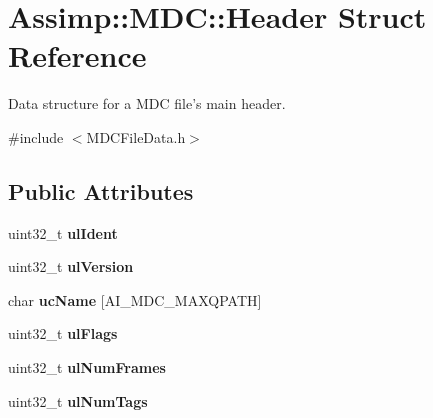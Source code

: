 \hypertarget{struct_assimp_1_1_m_d_c_1_1_header}{\section{Assimp\+:\+:M\+D\+C\+:\+:Header Struct Reference}
\label{struct_assimp_1_1_m_d_c_1_1_header}
}


Data structure for a M\+D\+C file's main header.  




{\ttfamily \#include $<$M\+D\+C\+File\+Data.\+h$>$}

\subsection*{Public Attributes}
\begin{DoxyCompactItemize}
\item 
\hypertarget{struct_assimp_1_1_m_d_c_1_1_header_adcd76905de71f9c87a34221511b21648}{uint32\+\_\+t {\bfseries ul\+Ident}}\label{struct_assimp_1_1_m_d_c_1_1_header_adcd76905de71f9c87a34221511b21648}

\item 
\hypertarget{struct_assimp_1_1_m_d_c_1_1_header_ae491dead8561b29f7d5e8c2b4e0e5202}{uint32\+\_\+t {\bfseries ul\+Version}}\label{struct_assimp_1_1_m_d_c_1_1_header_ae491dead8561b29f7d5e8c2b4e0e5202}

\item 
\hypertarget{struct_assimp_1_1_m_d_c_1_1_header_a1f0de2ba98f67cbdd0b9e15c8ea1a5c5}{char {\bfseries uc\+Name} \mbox{[}A\+I\+\_\+\+M\+D\+C\+\_\+\+M\+A\+X\+Q\+P\+A\+T\+H\mbox{]}}\label{struct_assimp_1_1_m_d_c_1_1_header_a1f0de2ba98f67cbdd0b9e15c8ea1a5c5}

\item 
\hypertarget{struct_assimp_1_1_m_d_c_1_1_header_a0973db3f06600cc05d9b3a641e76640d}{uint32\+\_\+t {\bfseries ul\+Flags}}\label{struct_assimp_1_1_m_d_c_1_1_header_a0973db3f06600cc05d9b3a641e76640d}

\item 
\hypertarget{struct_assimp_1_1_m_d_c_1_1_header_a36b7ce3cc444cbe08065d8fc7aa84103}{uint32\+\_\+t {\bfseries ul\+Num\+Frames}}\label{struct_assimp_1_1_m_d_c_1_1_header_a36b7ce3cc444cbe08065d8fc7aa84103}

\item 
\hypertarget{struct_assimp_1_1_m_d_c_1_1_header_a55e65e17c73cb04fa031ea07ac830233}{uint32\+\_\+t {\bfseries ul\+Num\+Tags}}\label{struct_assimp_1_1_m_d_c_1_1_header_a55e65e17c73cb04fa031ea07ac830233}


\end{DoxyCompactItemize}
